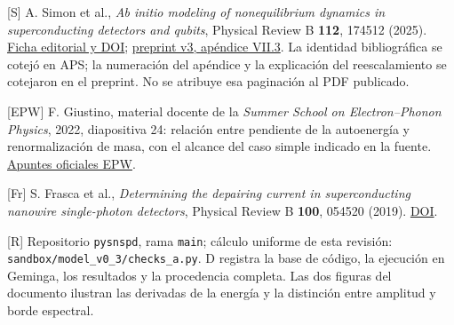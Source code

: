 \documentclass[
  spanish,
  10pt,
  a4paper,
]{article}
\newcounter{none} %
\begin{document}
{[}S{]} A. Simon et al., \emph{Ab initio modeling of nonequilibrium
dynamics in superconducting detectors and qubits}, Physical Review B
\textbf{112}, 174512 (2025).
\href{https://journals.aps.org/prb/abstract/10.1103/3m2k-mzr6}{Ficha
editorial y DOI};
\href{https://arxiv.org/html/2501.13791v3\#S7.SS3}{preprint v3, apéndice
VII.3}. La identidad bibliográfica se cotejó en APS; la numeración del
apéndice y la explicación del reescalamiento se cotejaron en el
preprint. No se atribuye esa paginación al PDF publicado.

{[}EPW{]} F. Giustino, material docente de la \emph{Summer School on
Electron--Phonon Physics}, 2022, diapositiva 24: relación entre
pendiente de la autoenergía y renormalización de masa, con el alcance
del caso simple indicado en la fuente.
\href{https://docs.epw-code.org/_downloads/720916b4aba43b13d75d323126c36a0c/Tue.2.Giustino.pdf}{Apuntes
oficiales EPW}.

{[}Fr{]} S. Frasca et al., \emph{Determining the depairing current in
superconducting nanowire single-photon detectors}, Physical Review B
\textbf{100}, 054520 (2019).
\href{https://doi.org/10.1103/PhysRevB.100.054520}{DOI}.

{[}R{]} Repositorio \nolinkurl{pysnspd}, rama \nolinkurl{main}; cálculo
uniforme de esta revisión: \nolinkurl{sandbox/model_v0_3/checks_a.py}. D
registra la base de código, la ejecución en Geminga, los resultados y la
procedencia completa. Las dos figuras del documento ilustran las
derivadas de la energía y la distinción entre amplitud y borde
espectral.
\end{document}
